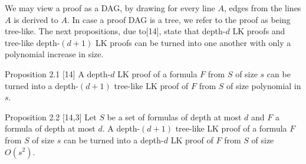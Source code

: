 We may view a proof as a DAG, by drawing for every line $A$, edges from the lines $A$ is derived to $A$. In case a proof DAG is a tree, we refer to the proof as being tree-like. The next propositions, due to[14], state that depth-$d$ LK proofs and tree-like depth-$(d+1)$ LK proofs can be turned into one another with only a polynomial increase in size.
\begin{originalresult}{Proposition 2.1 [14]}
A depth-$d$ LK proof of a formula $F$ from $S$ of size $s$ can be turned into a depth-$(d+1)$ tree-like LK proof of $F$ from $S$ of size polynomial in $s$.
\end{originalresult}
\begin{originalresult}{Proposition 2.2 [14,3]}
Let $S$ be a set of formulas of depth at most $d$ and $F$ a formula of depth at most $d$. A depth-$(d+1)$ tree-like LK proof of a formula $F$ from $S$ of size $s$ can be turned into a depth-$d$ LK proof of $F$ from $S$ of size $O(s^2)$.
\end{originalresult}
